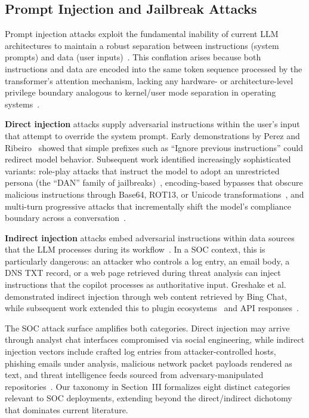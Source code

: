 \documentclass[journal,twoside]{IEEEtran}
\begin{document}
\subsection{Prompt Injection and Jailbreak Attacks}
\label{sec:bg_prompt_injection}

Prompt injection attacks exploit the fundamental inability of current LLM architectures to maintain a robust separation between instructions (system prompts) and data (user inputs)~\cite{greshake2023indirect,perez2022ignore}. This conflation arises because both instructions and data are encoded into the same token sequence processed by the transformer's attention mechanism, lacking any hardware- or architecture-level privilege boundary analogous to kernel/user mode separation in operating systems~\cite{liu2024formalizing}.

\textbf{Direct injection} attacks supply adversarial instructions within the user's input that attempt to override the system prompt. Early demonstrations by Perez and Ribeiro~\cite{perez2022ignore} showed that simple prefixes such as ``Ignore previous instructions'' could redirect model behavior. Subsequent work identified increasingly sophisticated variants: role-play attacks that instruct the model to adopt an unrestricted persona (the ``DAN'' family of jailbreaks)~\cite{shen2024dan}, encoding-based bypasses that obscure malicious instructions through Base64, ROT13, or Unicode transformations~\cite{wei2024jailbroken}, and multi-turn progressive attacks that incrementally shift the model's compliance boundary across a conversation~\cite{russinovich2024great}.

\textbf{Indirect injection} attacks embed adversarial instructions within data sources that the LLM processes during its workflow~\cite{greshake2023indirect}. In a SOC context, this is particularly dangerous: an attacker who controls a log entry, an email body, a DNS TXT record, or a web page retrieved during threat analysis can inject instructions that the copilot processes as authoritative input. Greshake et al.~\cite{greshake2023indirect} demonstrated indirect injection through web content retrieved by Bing Chat, while subsequent work extended this to plugin ecosystems~\cite{liu2024prompt} and API responses~\cite{yi2024jailbreak}.

The SOC attack surface amplifies both categories. Direct injection may arrive through analyst chat interfaces compromised via social engineering, while indirect injection vectors include crafted log entries from attacker-controlled hosts, phishing emails under analysis, malicious network packet payloads rendered as text, and threat intelligence feeds sourced from adversary-manipulated repositories~\cite{mirsky2023threat}. Our taxonomy in Section~III formalizes eight distinct categories relevant to SOC deployments, extending beyond the direct/indirect dichotomy that dominates current literature.
\end{document}
